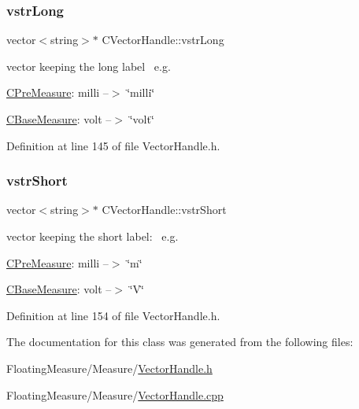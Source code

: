 \subsubsection{\texorpdfstring{vstr\+Long}{vstrLong}}
{\footnotesize\ttfamily vector$<$string$>$$\ast$ C\+Vector\+Handle\+::vstr\+Long\hspace{0.3cm}{\ttfamily [protected]}}



vector keeping the long label~\newline
 e.\+g. 


\begin{DoxyItemize}
\item \hyperlink{classCPreMeasure}{C\+Pre\+Measure}\+: milli --$>$ \char`\"{}milli\char`\"{}
\item \hyperlink{classCBaseMeasure}{C\+Base\+Measure}\+: volt --$>$ \char`\"{}volt\char`\"{} 
\end{DoxyItemize}

Definition at line 145 of file Vector\+Handle.\+h.

\mbox{\label{classCVectorHandle_afb50c8a33d4cf70bf92c644dca409ea2}} 
\subsubsection{\texorpdfstring{vstr\+Short}{vstrShort}}
{\footnotesize\ttfamily vector$<$string$>$$\ast$ C\+Vector\+Handle\+::vstr\+Short\hspace{0.3cm}{\ttfamily [protected]}}



vector keeping the short label\+:~\newline
 e.\+g. 


\begin{DoxyItemize}
\item \hyperlink{classCPreMeasure}{C\+Pre\+Measure}\+: milli --$>$ \char`\"{}m\char`\"{}
\item \hyperlink{classCBaseMeasure}{C\+Base\+Measure}\+: volt --$>$ \char`\"{}\+V\char`\"{} 
\end{DoxyItemize}

Definition at line 154 of file Vector\+Handle.\+h.



The documentation for this class was generated from the following files\+:\begin{DoxyCompactItemize}
\item 
Floating\+Measure/\+Measure/\hyperlink{VectorHandle_8h}{Vector\+Handle.\+h}\item 
Floating\+Measure/\+Measure/\hyperlink{VectorHandle_8cpp}{Vector\+Handle.\+cpp}\end{DoxyCompactItemize}
